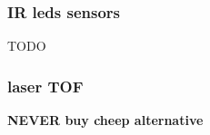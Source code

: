 \documentclass{beamer}
\begin{document}
\begin{frame}

  \frametitle{\bf IR leds sensors}
  TODO

\end{frame}


\begin{frame}
  
  \frametitle{\bf laser TOF}

  {\color{red} \bf{ NEVER } buy cheep alternative}

  

\end{frame}
\end{document}
